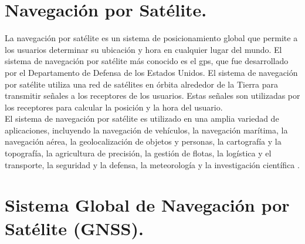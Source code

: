 \section*{\fontsize{12}{18}\selectfont Navegación por Satélite.}

\begin{justify}
    La navegación por satélite es un sistema de posicionamiento global que permite a los usuarios determinar su ubicación y hora en cualquier lugar del mundo.
    El sistema de navegación por satélite más conocido es el \gls{gps}, que fue desarrollado por el Departamento de Defensa de los Estados Unidos.
    El sistema de navegación por satélite utiliza una red de satélites en órbita alrededor de la Tierra para transmitir señales a los receptores de los usuarios.
    Estas señales son utilizadas por los receptores para calcular la posición y la hora del usuario.\\

    El sistema de navegación por satélite es utilizado en una amplia variedad de aplicaciones, incluyendo la navegación de vehículos, la navegación marítima,
    la navegación aérea, la geolocalización de objetos y personas, la cartografía y la topografía, la agricultura de precisión, la gestión de flotas,
    la logística y el transporte, la seguridad y la defensa, la meteorología y la investigación científica \parencite{kaplan2017understanding}.
\end{justify}

\section*{\fontsize{12}{18}\selectfont Sistema Global de Navegación por Satélite (GNSS).}

